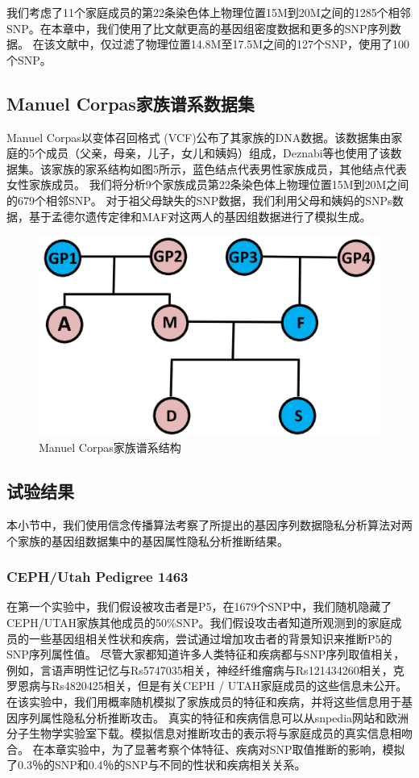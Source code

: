 我们考虑了11个家庭成员的第22条染色体上物理位置15M到20M之间的1285个相邻SNP。在本章中，我们使用了比文献\cite{deznabi2018inference}更高的基因组密度数据和更多的SNP序列数据。 在该文献中，仅过滤了物理位置14.8M至17.5M之间的127个SNP，使用了100个SNP。

\subsection{Manuel Corpas家族谱系数据集}
Manuel Corpas以变体召回格式 (VCF)公布了其家族的DNA数据。该数据集由家庭的5个成员（父亲，母亲，儿子，女儿和姨妈）组成，Deznabi等\cite{deznabi2018inference}也使用了该数据集。该家族的家系结构如图5所示，蓝色结点代表男性家族成员，其他结点代表女性家族成员。
我们将分析9个家族成员第22条染色体上物理位置15M到20M之间的679个相邻SNP。 对于祖父母缺失的SNP数据，我们利用父母和姨妈的SNPs数据，基于孟德尔遗传定律和MAF对这两人的基因组数据进行了模拟生成。

\begin{figure}[htbp]
	\centering
	\includegraphics[width=0.6\linewidth]{./figures/Manuel-Corpas-Family-Pedigree.jpg}
	\centering
	\caption{Manuel Corpas家族谱系结构}\label{fig:Manuel-Corpas-Family-Pedigree}
\end{figure}

\subsection{试验结果}
本小节中，我们使用信念传播算法考察了所提出的基因序列数据隐私分析算法对两个家族的基因组数据集中的基因属性隐私分析推断结果。

\subsubsection{CEPH/Utah Pedigree 1463}

在第一个实验中，我们假设被攻击者是P5，在1679个SNP中，我们随机隐藏了CEPH/UTAH家族其他成员的50\%SNP。我们假设攻击者知道所观测到的家庭成员的一些基因组相关性状和疾病，尝试通过增加攻击者的背景知识来推断P5的SNP序列属性值。 尽管大家都知道许多人类特征和疾病都与SNP序列取值相关，例如，言语声明性记忆与Rs5747035相关，神经纤维瘤病与Rs121434260相关，克罗恩病与Rs4820425相关，但是有关CEPH / UTAH家庭成员的这些信息未公开。 在该实验中，我们用概率随机模拟了家族成员的特征和疾病，并将这些信息用于基因序列属性隐私分析推断攻击。 真实的特征和疾病信息可以从snpedia网站和欧洲分子生物学实验室下载。模拟信息对推断攻击的表示将与家庭成员的真实信息相吻合。 在本章实验中，为了显著考察个体特征、疾病对SNP取值推断的影响，模拟了0.3％的SNP和0.4％的SNP与不同的性状和疾病相关关系。

